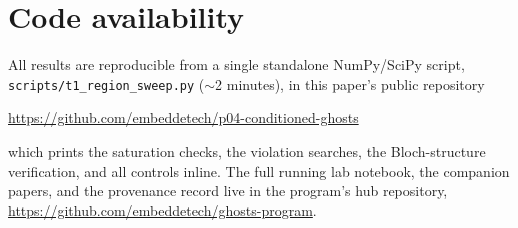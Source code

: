 \documentclass[11pt]{article}
\theoremstyle{remark}
\begin{document}
\section*{Code availability}
\label{sec:code}

All results are reproducible from a single standalone NumPy/SciPy
script, \texttt{scripts/t1\_\allowbreak region\_\allowbreak sweep.py} ($\sim$2 minutes),
in this paper's public repository
\begin{center}
\url{https://github.com/embeddetech/p04-conditioned-ghosts}
\end{center}
which prints the saturation checks, the violation searches, the
Bloch-structure verification, and all controls inline. The full
running lab notebook, the companion papers, and the provenance
record live in the program's hub repository,
\url{https://github.com/embeddetech/ghosts-program}.
\end{document}
